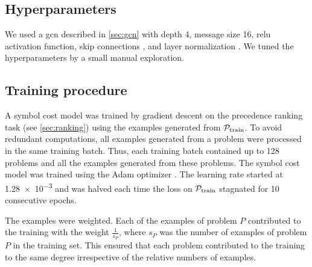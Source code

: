 \subsection{Hyperparameters}

We used a \gls{gcn} described in \cref{sec:gcn}
with depth 4, message size 16, \gls{relu} activation function,
skip connections \cite{Zhou2018}, and layer normalization \cite{Ba2016}.
We tuned the hyperparameters by a small manual exploration.

\subsection{Training procedure}

A symbol cost model was trained by gradient descent
on the precedence ranking task (see \cref{sec:ranking})
using the examples generated from $\operatorname{\mathcal{P}_{\mathrm{train}}}$.
To avoid redundant computations, all examples generated from a problem were processed in the same training batch.
Thus, each training batch contained up to \num{128} problems and all the examples generated from these problems.
The symbol cost model was trained using the Adam optimizer \cite{Kingma2014}.
The learning rate started at \num{1.28e-3}
and was halved each time the loss on $\operatorname{\mathcal{P}_{\mathrm{train}}}$ stagnated for 10 consecutive epochs.

The examples were weighted.
Each of the examples of problem $P$ contributed to the training with the weight $\frac{1}{s_P}$,
where $s_P$ was the number of examples of problem $P$ in the training set.
This ensured that each problem contributed to the training to the same degree irrespective of the relative numbers of examples.


